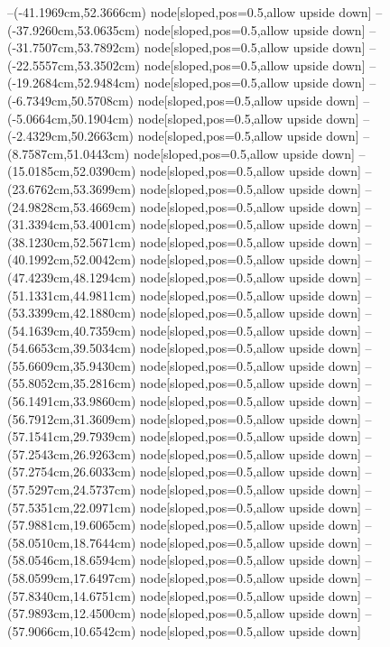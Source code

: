 --(-41.1969cm,52.3666cm) node[sloped,pos=0.5,allow upside down]{\ArrowIn}
--(-37.9260cm,53.0635cm) node[sloped,pos=0.5,allow upside down]{\ArrowIn}
--(-31.7507cm,53.7892cm) node[sloped,pos=0.5,allow upside down]{\ArrowIn}
--(-22.5557cm,53.3502cm) node[sloped,pos=0.5,allow upside down]{\ArrowIn}
--(-19.2684cm,52.9484cm) node[sloped,pos=0.5,allow upside down]{\ArrowIn}
--(-6.7349cm,50.5708cm) node[sloped,pos=0.5,allow upside down]{\ArrowIn}
--(-5.0664cm,50.1904cm) node[sloped,pos=0.5,allow upside down]{\ArrowIn}
--(-2.4329cm,50.2663cm) node[sloped,pos=0.5,allow upside down]{\ArrowIn}
--(8.7587cm,51.0443cm) node[sloped,pos=0.5,allow upside down]{\ArrowIn}
--(15.0185cm,52.0390cm) node[sloped,pos=0.5,allow upside down]{\ArrowIn}
--(23.6762cm,53.3699cm) node[sloped,pos=0.5,allow upside down]{\ArrowIn}
--(24.9828cm,53.4669cm) node[sloped,pos=0.5,allow upside down]{\ArrowIn}
--(31.3394cm,53.4001cm) node[sloped,pos=0.5,allow upside down]{\ArrowIn}
--(38.1230cm,52.5671cm) node[sloped,pos=0.5,allow upside down]{\ArrowIn}
--(40.1992cm,52.0042cm) node[sloped,pos=0.5,allow upside down]{\ArrowIn}
--(47.4239cm,48.1294cm) node[sloped,pos=0.5,allow upside down]{\ArrowIn}
--(51.1331cm,44.9811cm) node[sloped,pos=0.5,allow upside down]{\ArrowIn}
--(53.3399cm,42.1880cm) node[sloped,pos=0.5,allow upside down]{\ArrowIn}
--(54.1639cm,40.7359cm) node[sloped,pos=0.5,allow upside down]{\ArrowIn}
--(54.6653cm,39.5034cm) node[sloped,pos=0.5,allow upside down]{\ArrowIn}
--(55.6609cm,35.9430cm) node[sloped,pos=0.5,allow upside down]{\ArrowIn}
--(55.8052cm,35.2816cm) node[sloped,pos=0.5,allow upside down]{\arrowIn}
--(56.1491cm,33.9860cm) node[sloped,pos=0.5,allow upside down]{\ArrowIn}
--(56.7912cm,31.3609cm) node[sloped,pos=0.5,allow upside down]{\ArrowIn}
--(57.1541cm,29.7939cm) node[sloped,pos=0.5,allow upside down]{\ArrowIn}
--(57.2543cm,26.9263cm) node[sloped,pos=0.5,allow upside down]{\ArrowIn}
--(57.2754cm,26.6033cm) node[sloped,pos=0.5,allow upside down]{\arrowIn}
--(57.5297cm,24.5737cm) node[sloped,pos=0.5,allow upside down]{\ArrowIn}
--(57.5351cm,22.0971cm) node[sloped,pos=0.5,allow upside down]{\ArrowIn}
--(57.9881cm,19.6065cm) node[sloped,pos=0.5,allow upside down]{\ArrowIn}
--(58.0510cm,18.7644cm) node[sloped,pos=0.5,allow upside down]{\arrowIn}
--(58.0546cm,18.6594cm) node[sloped,pos=0.5,allow upside down]{\arrowIn}
--(58.0599cm,17.6497cm) node[sloped,pos=0.5,allow upside down]{\ArrowIn}
--(57.8340cm,14.6751cm) node[sloped,pos=0.5,allow upside down]{\ArrowIn}
--(57.9893cm,12.4500cm) node[sloped,pos=0.5,allow upside down]{\ArrowIn}
--(57.9066cm,10.6542cm) node[sloped,pos=0.5,allow upside down]{\ArrowIn}
